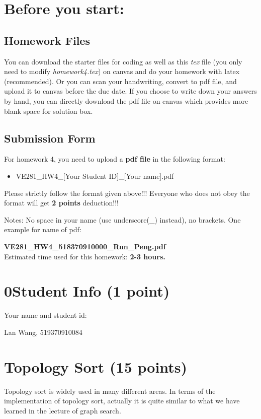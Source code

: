 \documentclass[11pt]{exam}
\begin{document}
\setlength{\parindent}{0pt}
\section*{Before you start:}

\subsection*{Homework Files}
You can download the starter files for coding as well as this \textit{tex} file (you only need to modify \textit{homework4.tex}) on canvas and do your homework with latex (recommended). Or you can scan your handwriting, convert to pdf file, and upload it to canvas before the due date. If you choose to write down your answers by hand, you can directly download the pdf file on canvas which provides more blank space for solution box.\\

\subsection*{Submission Form}
For homework 4, you need to upload a \textbf{pdf file} in the following format:
\begin{itemize}
\item VE281\_HW4\_[Your Student ID]\_[Your name].pdf
\end{itemize}
{\color{red}Please strictly follow the format given above!!! Everyone who does not obey the format will get \textbf{2 points} deduction!!!}

Notes: No space in your name (use underscore(\_) instead), no brackets. One example for name of pdf:

\textbf{VE281\_HW4\_518370910000\_Run\_Peng.pdf}\\



Estimated time used for this homework: \textbf{2-3 hours.}

\newpage
\section*{0\quad Student Info (1 point)}
Your name and student id:
\begin{solution}
Lan Wang, 519370910084
\end{solution}

\section{Topology Sort (15 points)}
Topology sort is widely used in many different areas. In terms of the implementation of topology sort, actually it is quite similar to what we have learned in the lecture of graph search. \\
\end{document}
